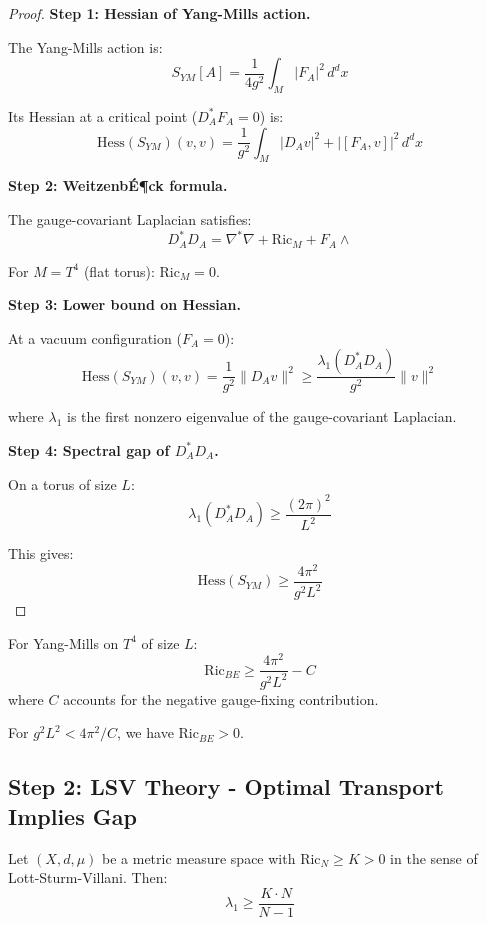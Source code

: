 \begin{proof}
\textbf{Step 1: Hessian of Yang-Mills action.}

The Yang-Mills action is:
\[
S_{YM}[A] = \frac{1}{4g^2} \int_M |F_A|^2 \, d^dx
\]

Its Hessian at a critical point ($D_A^* F_A = 0$) is:
\[
\mathrm{Hess}(S_{YM})(v, v) = \frac{1}{g^2} \int_M |D_A v|^2 + |[F_A, v]|^2 \, d^dx
\]

\textbf{Step 2: Weitzenb\'E¶ck formula.}

The gauge-covariant Laplacian satisfies:
\[
D_A^* D_A = \nabla^* \nabla + \mathrm{Ric}_M + F_A \wedge
\]

For $M = T^4$ (flat torus): $\mathrm{Ric}_M = 0$.

\textbf{Step 3: Lower bound on Hessian.}

At a vacuum configuration ($F_A = 0$):
\[
\mathrm{Hess}(S_{YM})(v, v) = \frac{1}{g^2} \|D_A v\|^2 \geq \frac{\lambda_1(D_A^* D_A)}{g^2} \|v\|^2
\]

where $\lambda_1$ is the first nonzero eigenvalue of the gauge-covariant Laplacian.

\textbf{Step 4: Spectral gap of $D_A^* D_A$.}

On a torus of size $L$:
\[
\lambda_1(D_A^* D_A) \geq \frac{(2\pi)^2}{L^2}
\]

This gives:
\[
\mathrm{Hess}(S_{YM}) \geq \frac{4\pi^2}{g^2 L^2}
\]
\end{proof}

\begin{corollary}
\label{cor:bakry-emery-bound}
For Yang-Mills on $T^4$ of size $L$:
\[
\mathrm{Ric}_{BE} \geq \frac{4\pi^2}{g^2 L^2} - C
\]
where $C$ accounts for the negative gauge-fixing contribution.

For $g^2 L^2 < 4\pi^2/C$, we have $\mathrm{Ric}_{BE} > 0$.
\end{corollary}

\subsection{Step 2: LSV Theory - Optimal Transport Implies Gap}

\begin{theorem}
\label{thm:lsv-gap}
Let $(X, d, \mu)$ be a metric measure space with $\mathrm{Ric}_N \geq K > 0$ 
in the sense of Lott-Sturm-Villani. Then:
\[
\lambda_1 \geq \frac{K \cdot N}{N-1}
\]
\end{theorem}


